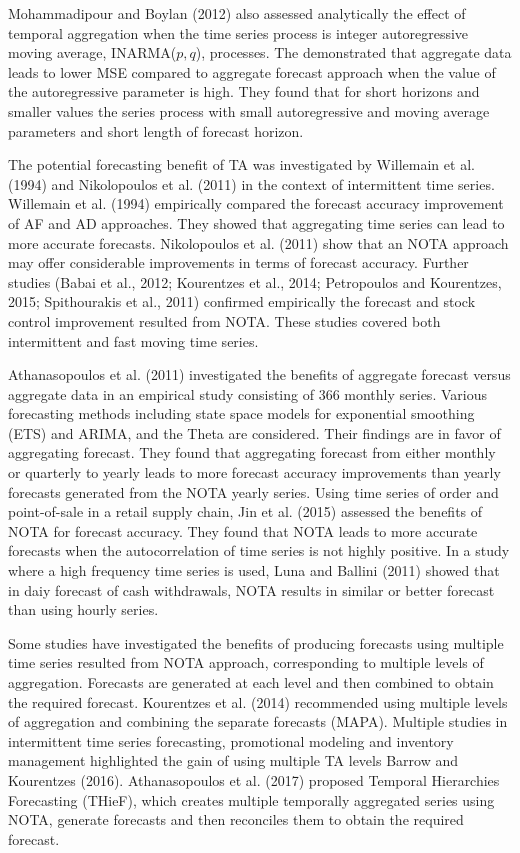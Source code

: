 \documentclass[]{elsarticle} %
\begin{document}
Mohammadipour and Boylan (2012) also assessed analytically the effect of
temporal aggregation when the time series process is integer
autoregressive moving average, INARMA(\(p,q\)), processes. The
demonstrated that aggregate data leads to lower MSE compared to
aggregate forecast approach when the value of the autoregressive
parameter is high. They found that for short horizons and smaller values
the series process with small autoregressive and moving average
parameters and short length of forecast horizon.

The potential forecasting benefit of TA was investigated by Willemain et
al. (1994) and Nikolopoulos et al. (2011) in the context of intermittent
time series. Willemain et al. (1994) empirically compared the forecast
accuracy improvement of AF and AD approaches. They showed that
aggregating time series can lead to more accurate forecasts.
Nikolopoulos et al. (2011) show that an NOTA approach may offer
considerable improvements in terms of forecast accuracy. Further studies
(Babai et al., 2012; Kourentzes et al., 2014; Petropoulos and
Kourentzes, 2015; Spithourakis et al., 2011) confirmed empirically the
forecast and stock control improvement resulted from NOTA. These studies
covered both intermittent and fast moving time series.

Athanasopoulos et al. (2011) investigated the benefits of aggregate
forecast versus aggregate data in an empirical study consisting of 366
monthly series. Various forecasting methods including state space models
for exponential smoothing (ETS) and ARIMA, and the Theta are considered.
Their findings are in favor of aggregating forecast. They found that
aggregating forecast from either monthly or quarterly to yearly leads to
more forecast accuracy improvements than yearly forecasts generated from
the NOTA yearly series. Using time series of order and point-of-sale in
a retail supply chain, Jin et al. (2015) assessed the benefits of NOTA
for forecast accuracy. They found that NOTA leads to more accurate
forecasts when the autocorrelation of time series is not highly
positive. In a study where a high frequency time series is used, Luna
and Ballini (2011) showed that in daiy forecast of cash withdrawals,
NOTA results in similar or better forecast than using hourly series.

Some studies have investigated the benefits of producing forecasts using
multiple time series resulted from NOTA approach, corresponding to
multiple levels of aggregation. Forecasts are generated at each level
and then combined to obtain the required forecast. Kourentzes et al.
(2014) recommended using multiple levels of aggregation and combining
the separate forecasts (MAPA). Multiple studies in intermittent time
series forecasting, promotional modeling and inventory management
highlighted the gain of using multiple TA levels Barrow and Kourentzes
(2016). Athanasopoulos et al. (2017) proposed Temporal Hierarchies
Forecasting (THieF), which creates multiple temporally aggregated series
using NOTA, generate forecasts and then reconciles them to obtain the
required forecast.
\end{document}
